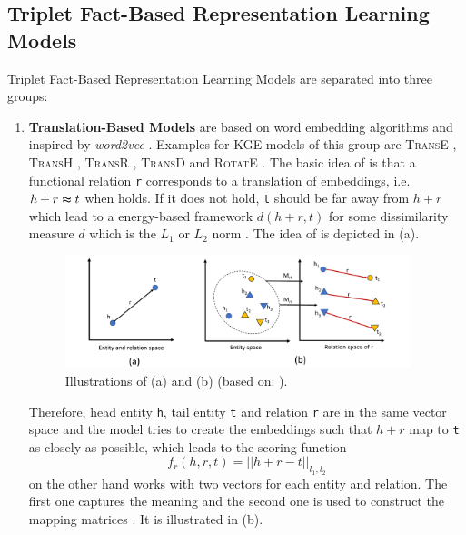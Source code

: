 \subsection{Triplet Fact-Based Representation Learning Models} 
\label{subsec:triplet_fact_based_representation_learning_models}

Triplet Fact-Based Representation Learning Models are separated into three groups:
\begin{enumerate}
    \item 
    \textbf{Translation-Based Models} are based on word embedding algorithms and inspired by \textit{word2vec} \cite{electronics9050750}.
    Examples for \ac{KGE} models of this group are \textsc{TransE} \cite{TransE}, \textsc{TransH} \cite{TransH}, \textsc{TransR} \cite{TransR}, \textsc{TransD} \cite{TransD}
    and 
    \textsc{RotatE} \cite{RotatE}.
    The basic idea of \transe is that a functional relation \texttt{r} corresponds to a translation of embeddings, i.e. $h + r \thickapprox t$ when  holds.
    If it does not hold, \texttt{t} should be far away from $h + r$ which lead to a energy-based framework $d(h+r, t)$ for some dissimilarity measure $d$ which is the $L_1$ or $L_2$ norm \cite{TransE}.
    The idea of \transe is depicted in  (a).
    \begin{figure}[t]
      \centering
        \includegraphics[width=0.95\textwidth]{figures/Transe+TransD.pdf}
      \caption{Illustrations of (a) \transe and (b) \transd (based on: \cite{electronics9050750}).}
      \label{fig:translationbasedmodels}
    \end{figure}
    Therefore, head entity \texttt{h}, tail entity \texttt{t} and relation \texttt{r} are in the same vector space and the model tries to create the embeddings such that $h+r$ map to \texttt{t} as closely as possible, which leads to the scoring function
    \begin{equation}
        f_r(h,r,t) = || h + r - t ||_{l_1, l_2}
        \label{eq:transescoringfunction}
    \end{equation}
    \transd on the other hand works with two vectors for each entity and relation.
    The first one captures the meaning and the second one is used to construct the mapping matrices \cite{TransD}.
    It is illustrated in  (b).
    

\end{enumerate}
